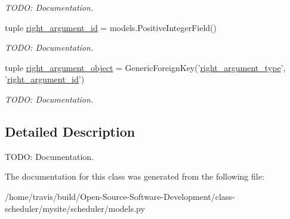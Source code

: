 \begin{DoxyCompactItemize}
\begin{DoxyCompactList}\small\item\em T\-O\-D\-O\-: Documentation. \end{DoxyCompactList}\item 
\hypertarget{classscheduler_1_1models_1_1_user_preference_or_constraint_adbb69d170fd984fe2ec36e340cdf3533}{tuple \hyperlink{classscheduler_1_1models_1_1_user_preference_or_constraint_adbb69d170fd984fe2ec36e340cdf3533}{right\-\_\-argument\-\_\-id} = models.\-Positive\-Integer\-Field()}\label{classscheduler_1_1models_1_1_user_preference_or_constraint_adbb69d170fd984fe2ec36e340cdf3533}

\begin{DoxyCompactList}\small\item\em T\-O\-D\-O\-: Documentation. \end{DoxyCompactList}\item 
\hypertarget{classscheduler_1_1models_1_1_user_preference_or_constraint_a3a80b4294939af457c24a9377bc43239}{tuple \hyperlink{classscheduler_1_1models_1_1_user_preference_or_constraint_a3a80b4294939af457c24a9377bc43239}{right\-\_\-argument\-\_\-object} = Generic\-Foreign\-Key('\hyperlink{classscheduler_1_1models_1_1_user_preference_or_constraint_a30dcc18f79528b7860691bced63d3426}{right\-\_\-argument\-\_\-type}', '\hyperlink{classscheduler_1_1models_1_1_user_preference_or_constraint_adbb69d170fd984fe2ec36e340cdf3533}{right\-\_\-argument\-\_\-id}')}\label{classscheduler_1_1models_1_1_user_preference_or_constraint_a3a80b4294939af457c24a9377bc43239}

\begin{DoxyCompactList}\small\item\em T\-O\-D\-O\-: Documentation. \end{DoxyCompactList}\end{DoxyCompactItemize}


\subsection{Detailed Description}
T\-O\-D\-O\-: Documentation. 

The documentation for this class was generated from the following file\-:\begin{DoxyCompactItemize}
\item 
/home/travis/build/\-Open-\/\-Source-\/\-Software-\/\-Development/class-\/scheduler/mysite/scheduler/models.\-py\end{DoxyCompactItemize}
